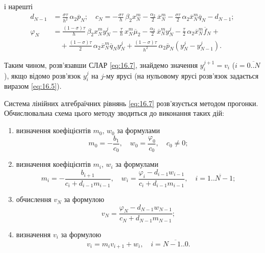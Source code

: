 \documentclass[12pt, a4paper]{article}
\newcommand{\ol}[1]{\overline{#1}}
\newcommand{\range}[2]{\ol{#1..#2}}
\renewcommand{\phi}{\varphi}
\begin{document}
і нарешті
\begin{equation}
    \label{eq:16.8.3}
    \begin{aligned}
        d_{N - 1} &= \frac{\sigma \tau}{h^2} \, \alpha_2 \ol p_N; \quad c_N = -\frac{\sigma \tau}{h} \, \beta_2 x_N^m - \frac{\alpha_2}{2} \, \ol x_N^m - \frac{\sigma \tau}{2} \, \alpha_2 \ol x_N^m \ol q_N - d_{N - 1}; \\
        \phi_N &= \frac{(1 - \sigma) \tau}{h} \, \beta_2 x_N^m y_N^j - \frac{\tau}{h} \, x_N^m \ol \mu_2 - \frac{\alpha_2}{2} \, \ol x_N^m y_N^j - \frac{\tau}{2} \, \alpha_2 \ol x_N^m \ol f_N + \\
        &\quad + \frac{(1 - \sigma) \tau}{2} \, \alpha_2 \ol x_N^m \ol q_N y_N^j + \frac{(1 - \sigma) \tau}{h^2} \, \alpha_2 \ol p_N \left( y_N^j - y_{N - 1}^j \right).
    \end{aligned}
\end{equation}

Таким чином, розв'язавши СЛАР \eqref{eq:16.7}, знайдемо значення $y_i^{j + 1} = v_i$ ($i = \range{0}{N}$), якщо відомо розв'язок $y_i^j$ на $j$-му ярусі (на нульовому ярусі розв'язок задається виразом \eqref{eq:16.5}). \medskip

Система лінійних алгебраїчних рівнянь \eqref{eq:16.7} розв'язується методом прогонки. Обчислювальна схема цього методу зводиться до виконання таких дій:
\begin{enumerate}[label=\alph*)]
    \item визначення коефіцієнтів $m_0$, $w_0$ за формулами
    \begin{equation*}
        m_0 = -\frac{b_1}{c_0}, \quad w_0 = \frac{\phi_0}{c_0}, \quad c_0 \ne 0;
    \end{equation*}
    \item визначення коефіцієнтів $m_i$, $w_i$ за формулами
    \begin{equation*}
        m_i = -\frac{b_{i + 1}}{c_i + d_{i - 1} m_{i - 1}}, \quad w_i = \frac{\phi_i - d_{i - 1} w_{i - 1}}{c_i + d_{i - 1} m_{i - 1}}, \quad i = \range{1}{N - 1};
    \end{equation*}
    \item обчислення $v_N$ за формулою
    \begin{equation*}
        v_N = \frac{\phi_N - d_{N - 1} w_{N - 1}}{c_N + d_{N - 1} m_{N - 1}};
    \end{equation*}
    \item визначення $v_i$ за формулою
    \begin{equation*}
        v_i = m_i v_{i + 1} + w_i, \quad i = \range{N - 1}{0}.
    \end{equation*}
\end{enumerate}
\end{document}
